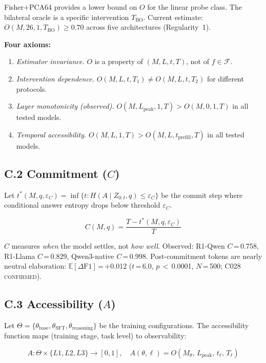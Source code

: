 \documentclass[11pt]{article}
\begin{document}
Fisher+PCA64 provides a lower bound on $O$ for the linear probe class. The bilateral
oracle is a specific intervention $T_{\mathrm{BO}}$. Current estimate:
$O(M, 26, 1, T_{\mathrm{BO}}) \geq 0.70$ across five architectures (Regularity~1).

\textbf{Four axioms:}
\begin{enumerate}
  \item \emph{Estimator invariance.} $O$ is a property of $(M, L, t, T)$, not of $f \in \mathcal{F}$.
  \item \emph{Intervention dependence.} $O(M, L, t, T_1) \neq O(M, L, t, T_2)$ for different protocols.
  \item \emph{Layer monotonicity (observed).} $O(M, L_{\text{peak}}, 1, T) > O(M, 0, 1, T)$ in all tested models.
  \item \emph{Temporal accessibility.} $O(M, L, 1, T) > O(M, L, t_{\text{prefill}}, T)$ in all tested models.
\end{enumerate}

\subsection*{C.2 Commitment ($C$)}

Let $t^*(M, q, \varepsilon_C) = \inf\{t : H(A \mid Z_{0:t}, q) \leq \varepsilon_C\}$ be the
commit step where conditional answer entropy drops below threshold $\varepsilon_C$.

\begin{equation}
C(M, q) = \frac{T - t^*(M, q, \varepsilon_C)}{T}
\end{equation}

$C$ measures \emph{when} the model settles, not \emph{how well}. Observed: R1-Qwen
$C$\,=\,0.758, R1-Llama $C$\,=\,0.829, Qwen3-native $C$\,=\,0.998. Post-commitment
tokens are nearly neutral elaboration: $\mathbb{E}[\Delta\text{F1}]$\,=\,$+$0.012
($t$\,=\,6.0, $p$\,$<$\,0.0001, $N$\,=\,500; C028 \textsc{confirmed}).

\subsection*{C.3 Accessibility ($A$)}

Let $\Theta = \{\theta_{\text{base}}, \theta_{\text{SFT}}, \theta_{\text{reasoning}}\}$
be the training configurations. The accessibility function maps (training stage, task
level) to observability:

\begin{equation}
A : \Theta \times \{L1, L2, L3\} \to [0,1], \quad
A(\theta, \ell) = O(M_\theta,\, L_{\text{peak}},\, t_\ell,\, T_\ell)
\end{equation}
\end{document}
